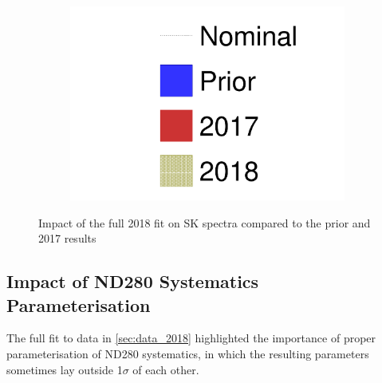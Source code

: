 \begin{figure}[h]
\begin{subfigure}[t]{0.32\textwidth}
		\includegraphics[width=\textwidth, trim={0mm 0mm 0mm 0mm}, clip, page=4]{figures/mach3/2018/data/prior_error_1june_try_2017_fit_on_sk_spectra_2018_results_test_spectra}
	\end{subfigure}
	
	\caption{Impact of the full 2018 fit on SK spectra compared to the prior and 2017 results}
	\label{fig:sk_2018}
\end{figure}

\subsection{Impact of ND280 Systematics Parameterisation}
The full fit to data in \autoref{sec:data_2018} highlighted the importance of proper parameterisation of ND280 systematics, in which the resulting parameters sometimes lay outside 1$\sigma$ of each other. 

